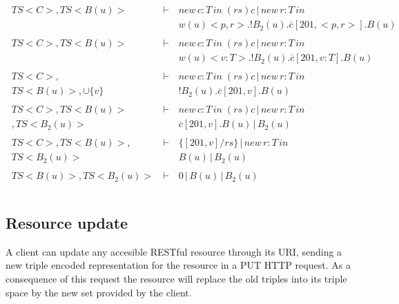 \begin{eqnarray*}
 \ TS<C>,TS<B(u)>\, &\vdash\,& new\,c:T\,in\;(rs)c\,|\,new\,r:T\,in\;\\
 \               &\,      & w(u)<p,r>.!B_2(u).\overline{c}[201,<p,r>].B(u) \\
 \               &        & \\
 \ TS<C>,TS<B(u)>\, &\vdash\,& new\,c:T\,in\;(rs)c\,|\,new\,r:T\,in\;\\
 \               &\,      & w(u)<v:T>.!B_2(u).\overline{c}[201,v:T].B(u) \\
 \               &        & \\
 \ TS<C>,&\vdash\,& new\,c:T\,in\;(rs)c\,|\,new\,r:T\,in\;\\
 \ TS<B(u)>,\cup\{v\}\, &\,      & !B_2(u).\overline{c}[201,v].B(u) \\
 \               &        & \\
 \ TS<C>,TS<B(u)>\, &\vdash\,& new\,c:T\,in\;(rs)c\,|\,new\,r:T\,in\;\\
 \ ,TS<B_2(u)>              &\,      & \overline{c}[201,v].B(u)\,|\,B_2(u) \\
 \               &        & \\
 \ TS<C>,TS<B(u)>,\, &\vdash\,& \{[201,v]/rs\}\,|\,new\,r:T\,in\;\\
 \ TS<B_2(u)>              &\,      & B(u)\,|\,B_2(u) \\
 \               &        & \\
 \ TS<B(u)>,TS<B_2(u)>\, &\vdash\,& 0\,|\,B(u)\,|\,B_2(u) \\
 \               &        & \\
\end{eqnarray*}

\subsection{Resource update}

A client can update any accesible RESTful resource through its URI, sending a new triple encoded representation for the resource in a PUT HTTP request. As a consequence of this request the resource will replace the old triples into its triple space by the new set provided by the client.

